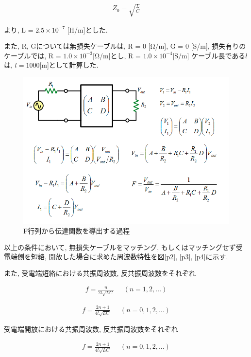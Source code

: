 \documentclass[a4j,12pt,]{jarticle}
\begin{document}
\large
\begin{eqnarray}
  Z_0 =  \sqrt{\frac{L}{C}}
\end{eqnarray}
\normalsize

より, L = $2.5 × 10^{-7}$ [H/m]とした.

また, R, Gについては無損失ケーブルは, R = 0 [Ω/m], G = 0 [S/m], 損失有りのケーブルでは, R = $1.0 × 10^{-3}$[Ω/m]とし, R = $1.0 × 10^{-4}$[S/m] ケーブル長である$l$は, $l = 1000$[m]として計算した.

\begin{figure}[H]
  \begin{center}
    \includegraphics[width=140mm]{transfer.png}
    \caption{F行列から伝達関数を導出する過程}
    \label{p1}
  \end{center}
\end{figure}

以上の条件において, 無損失ケーブルをマッチング, もしくはマッチングせず受電端側を短絡, 開放した場合に求めた周波数特性を図\ref{p2}, \ref{p3}, \ref{p4}に示す.

また, 受電端短絡における共振周波数, 反共振周波数をそれぞれ

\begin{eqnarray}
  f =  \frac{n}{2l\sqrt{LC}}\;\;\;\;\;(n = 1, 2, ...)
\end{eqnarray}

\begin{eqnarray}
  f =  \frac{2n + 1}{4l\sqrt{LC}}\;\;\;\;\;(n = 0, 1, 2, ...)
\end{eqnarray}

受電端開放における共振周波数, 反共振周波数をそれぞれ

\begin{eqnarray}
  f =  \frac{2n + 1}{4l\sqrt{LC}}\;\;\;\;\;(n = 0, 1, 2, ...)
\end{eqnarray}
\end{document}
